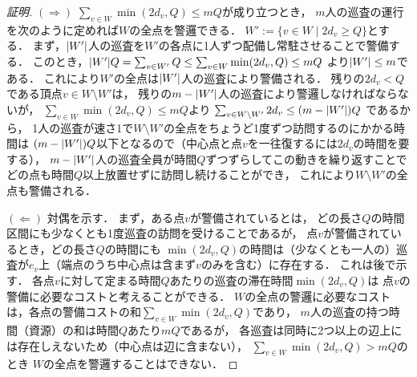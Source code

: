 \begin{proof}[証明]
  $(\Rightarrow)$
  $\sum_{v \in W} \min(2d_v, Q) \leq mQ$が成り立つとき，
  $m$人の巡査の運行を次のように定めれば$W$の全点を警邏できる．
  $W' := \{ v \in W \mid 2d_v \geq Q \}$とする．
  まず，$\lvert{W'}\rvert$人の巡査を$W'$の各点に1人ずつ配備し常駐させることで警備する．
  このとき，$\lvert{W'}\rvert Q = \sum_{v \in W'} Q \leq \sum_{v \in W} \min(2d_v, Q) \leq mQ$
  より$\lvert{W'}\rvert \leq m$である．
  これにより$W'$の全点は$\lvert{W'}\rvert$人の巡査により警備される．
  残りの$2d_v < Q$である頂点$v \in W \setminus W'$は，
  残りの$m - \lvert{W'}\rvert$人の巡査により警邏しなければならないが，
  $\sum_{v \in W} \min(2d_v, Q) \leq mQ$より
  $\sum_{v \in W \setminus W'} 2d_v \leq (m - \lvert{W'}\rvert)Q$
  であるから，
  1人の巡査が速さ1で$W \setminus W'$の全点をちょうど1度ずつ訪問するのにかかる時間は
  $(m - \lvert{W'}\rvert)Q$以下となるので（中心点と点$v$を一往復するには$2d_v$の時間を要する），
  $m - \lvert{W'}\rvert$人の巡査全員が時間$Q$ずつずらしてこの動きを繰り返すことで
  どの点も時間$Q$以上放置せずに訪問し続けることができ，
  これにより$W \setminus W'$の全点も警備される．

  $(\Leftarrow)$
  対偶を示す．
  まず，ある点$v$が警備されているとは，
  どの長さ$Q$の時間区間にも少なくとも1度巡査の訪問を受けることであるが，
  点$v$が警備されているとき，どの長さ$Q$の時間にも
  $\min(2d_v, Q)$の時間は（少なくとも一人の）巡査が$e_v$上（端点のうち中心点は含まず$v$のみを含む）に存在する．
  これは後で示す．
  各点$v$に対して定まる時間$Q$あたりの巡査の滞在時間$\min(2d_v, Q)$は
  点$v$の警備に必要なコストと考えることができる．
  $W$の全点の警邏に必要なコストは，各点の警備コストの和$\sum_{v \in W} \min(2d_v, Q)$であり，
  $m$人の巡査の持つ時間（資源）の和は時間$Q$あたり$mQ$であるが，
  各巡査は同時に2つ以上の辺上には存在しえないため（中心点は辺に含まない），
  $\sum_{v \in W} \min(2d_v, Q) > mQ$のとき
  $W$の全点を警邏することはできない．
  

\end{proof}
